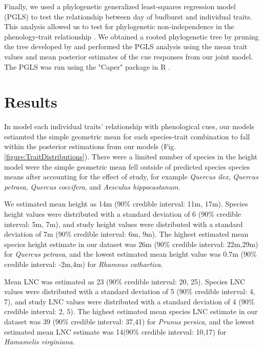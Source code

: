 \documentclass{article}\usepackage[]{graphicx}\usepackage[]{color}
\begin{document}

Finally, we used a phylogenetic generalized least-squares regression model (PGLS) to test the relationship between day of budburst and individual traits. This analysis allowed us to test for phylogenetic non-independence in the phenology-trait relationship \citep{Freckleton2002}. We obtained a rooted phylogenetic tree by pruning the tree developed by \citep{Smith2018} and performed the PGLS analysis using the mean trait values and mean posterior estimates of the cue responses from our joint model. The PGLS was run using the "Caper" package in R \citep{Orne2013}. \\

\section{Results}
In model each individual traits' relationship with phenological cues, our models estiamted the simple geometric mean for each species-trait combination to fall within the posterior estimations from our models (Fig. \ref{figure:TraitDistributions}). There were a limited number of species in the height model were the simple geometric mean fell outside of predicted species species means after accounting for the effect of study, for example \textit{Quercus ilex}, \textit{Quercus petraea}, \textit{Quercus coccifera}, and \textit{Aesculus hippocastanum}.

We estimated mean height as 14m (90\% credible interval: 11m, 17m). Species height values were distributed with a standard deviation  of 6 (90\% credible interval: 5m, 7m), and study height values were distributed with a standard deviation of 7m (90\% credible interval: 6m, 9m). The highest estimated mean species height estimate in our dataset was 26m (90\% credible interval: 22m,29m) for \textit{Quercus petraea}, and the lowest estimated mean height value was 0.7m (90\% credible interval: -2m,4m) for \textit{Rhamnus cathartica}. 

Mean LNC was estimated as 23 (90\% credible interval: 20, 25). Species LNC values were distributed with a standard deviation  of 5 (90\% credible interval: 4, 7), and study LNC values were distributed with a standard deviation  of 4 (90\% credible interval: 2, 5). The highest estimated mean species LNC estimate in our dataset was 39 (90\% credible interval: 37,41) for \textit{Prunus persica}, and the lowest estimated mean LNC estimate was 14(90\% credible interval: 10,17) for \textit{Hamamelis virginiana}.
\end{document}

